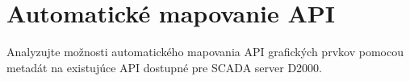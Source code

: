 \chapter{Automatické mapovanie API}

Analyzujte možnosti automatického mapovania \acs{API} grafických prvkov pomocou metadát na existujúce API dostupné pre \acs{SCADA} server D2000.

